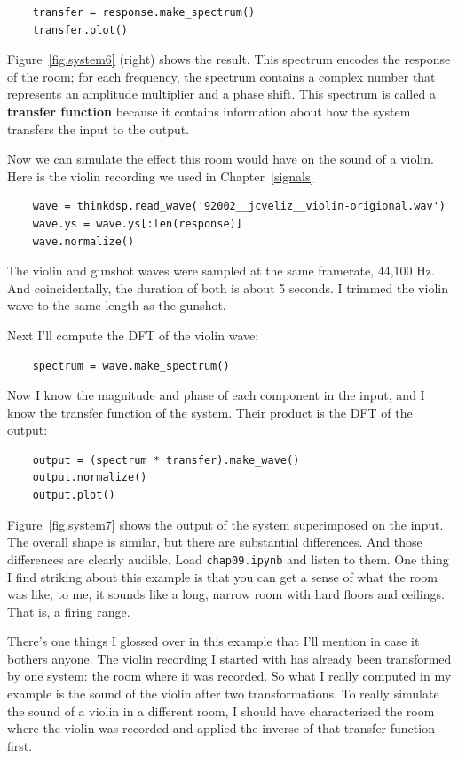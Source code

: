 \documentclass[12pt]{book}
\begin{document}
\begin{verbatim}
    transfer = response.make_spectrum()
    transfer.plot()
\end{verbatim}

Figure~\ref{fig.system6} (right) shows the result.  This spectrum
encodes the response of the room; for each frequency, the spectrum
contains a complex number that represents an amplitude multiplier and
a phase shift.  This spectrum is called a {\bf transfer
function} because it contains information about how the system transfers
the input to the output.

Now we can simulate the effect this room would have on the sound
of a violin.  Here is the violin recording we used in Chapter~\ref{signals}

\begin{verbatim}
    wave = thinkdsp.read_wave('92002__jcveliz__violin-origional.wav')
    wave.ys = wave.ys[:len(response)]
    wave.normalize()
\end{verbatim}

The violin and gunshot waves were sampled at the same framerate,
44,100 Hz.  And coincidentally, the duration of both is about 5
seconds.  I trimmed the violin wave to the same length as the
gunshot.

Next I'll compute the DFT of the violin wave:

\begin{verbatim}
    spectrum = wave.make_spectrum()
\end{verbatim}

Now I know the magnitude and phase of each component in the
input, and I know the transfer function of the system.  Their
product is the DFT of the output:

\begin{verbatim}
    output = (spectrum * transfer).make_wave()
    output.normalize()
    output.plot()
\end{verbatim}

Figure~\ref{fig.system7} shows the output of the system superimposed
on the input.  The overall shape is similar, but there are substantial
differences.  And those differences are clearly audible.  Load
{\tt chap09.ipynb} and listen to them.  One thing I find striking
about this example is that you can get a sense of what the room
was like; to me, it sounds like a long, narrow room with hard floors
and ceilings.  That is, a firing range.

There's one things I glossed over in this example that I'll mention
in case it bothers anyone.  The violin recording I started with
has already been transformed by one system: the room where it was
recorded.  So what I really computed in my example is the sound
of the violin after two transformations.  To really simulate
the sound of a violin in a different room, I should have characterized
the room where the violin was recorded and applied the inverse
of that transfer function first.
\end{document}
